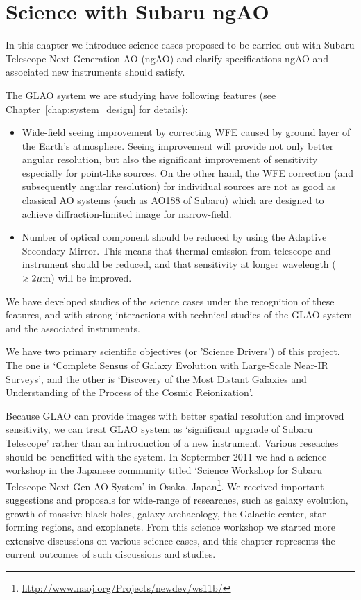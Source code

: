 \chapter{Science with Subaru ngAO
\label{chap:science}}

In this chapter we introduce science cases proposed to be carried out
with Subaru Telescope Next-Generation AO (ngAO) and clarify
specifications ngAO and associated new instruments should satisfy.

The GLAO system we are studying have following features (see
Chapter~\ref{chap:system_design} for details):

\begin{itemize}
\item Wide-field seeing improvement by correcting WFE caused by ground
      layer of the Earth's atmosphere. Seeing improvement will provide
      not only better angular resolution, but also the significant
      improvement of sensitivity especially for point-like sources. On
      the other hand, the WFE correction (and subsequently angular
      resolution) for individual sources are not as good as classical AO
      systems (such as AO188 of Subaru) which are designed to achieve
      diffraction-limited image for narrow-field. 
\item Number of optical component should be reduced by using the
      Adaptive Secondary Mirror. This means that thermal emission from
      telescope and instrument should be reduced, and that sensitivity
      at longer wavelength ($\gsim 2\mu$m) will be improved.
\end{itemize}

We have developed studies of the science cases under the recognition of
these features, and with strong interactions with technical studies of
the GLAO system and the associated instruments.

We have two primary scientific objectives (or 'Science Drivers') of this
project. The one is `Complete Sensus of Galaxy Evolution with
Large-Scale Near-IR Surveys', and the other is `Discovery of the Most
Distant Galaxies and Understanding of the Process of the Cosmic
Reionization'.

Because GLAO can provide images with better spatial resolution and
improved sensitivity, we can treat GLAO system as `significant upgrade
of Subaru Telescope' rather than an introduction of a new
instrument. Various reseaches should be benefitted with the system.
In Septermber 2011 we had a science workshop in the Japanese community
titled `Science Workshop for Subaru Telescope Next-Gen AO System' in
Osaka,
Japan\footnote{\href{http://www.naoj.org/Projects/newdev/ws11b/index.html}{http://www.naoj.org/Projects/newdev/ws11b/}}. 
We received important suggestions and proposals for wide-range of
researches, such as galaxy evolution, growth of massive black holes,
galaxy archaeology, the Galactic center, star-forming regions, and
exoplanets. From this science workshop we started more extensive
discussions on various science cases, and this chapter represents the
current outcomes of such discussions and studies.
